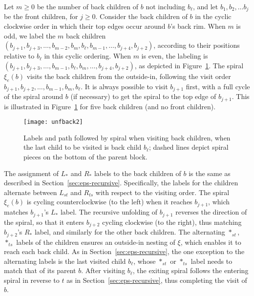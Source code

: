 \documentclass[11pt]{article}
\def\nothing{\ast}
\begin{document}
Let $m \geq 0$ be the number of back children of $b$ not including $b_\ell$,
and let $b_1, b_2, \dots b_j$ be the front children, for $j \geq 0$.
Consider the back children of $b$ in the cyclic clockwise order in which their top edges
occur around $b$'s back rim.
When $m$ is odd, we label the $m$ back children
$(b_{j+1}, b_{j+3}, \dots, b_{m-2},  b_m, b_\ell, b_{m-1}, \dots,  b_{j+4}, b_{j+2})$,
according to their positions relative to $b_\ell$ in this cyclic ordering.
When $m$ is even, the labeling is $(b_{j+1}, b_{j+3}, \dots, b_{m-1}, b_\ell, b_{m}, \dots,  b_{j+4}, b_{j+2})$,
as depicted in Figure~\ref{fig:unfback}. The spiral
$\xi_e(b)$ visits the back children from the outside-in, following the visit order
$b_{j+1}, b_{j+2}, \dots, b_{m-1}, b_{m}, b_\ell$.
It is always possible to visit $b_{j+1}$ first,
with a full cycle of the spiral around $b$ (if necessary) to get the spiral
to the top edge of $b_{j+1}$. This is illustrated in Figure~\ref{fig:unfback}
for five back children (and no front children).



\begin{figure}[htbp]
\centering
\texttt{[image: unfback2]}
\caption{Labels and path followed by spiral when visiting back children, when the last child
to be visited is back child $b_\ell$;
dashed
lines depict spiral pieces on the bottom of the parent block.}
\label{fig:unfback}
\end{figure}


The assignment of $L_{\nothing}$ and $R_{\nothing}$ labels to the back children of $b$ is the same as described
in Section~\ref{sec:eps-recursive}.
Specifically, the labels for the children alternate between $L_{st}$
and $R_{ts}$ with respect to the visiting order.  The spiral $\xi_e(b)$ is cycling
counterclockwise (to the left) when it reaches $b_{j+1}$, which
matches $b_{j+1}$'s $L_{\nothing}$ label.
The recursive unfolding of $b_{j+1}$ reverses the direction of the spiral, so
that it enters
$b_{j+2}$
cycling clockwise (to the right), thus matching
$b_{j+2}$'s $R_{\nothing}$ label,
and similarly for the other back children.  The
alternating $\nothing_{st}$, $\nothing_{ts}$ labels of the children ensures an outside-in
nesting of $\xi$, which enables it to reach each back
child.  As in Section~\ref{sec:eps-recursive}, the one exception to the
alternating labels is the last visited child $b_\ell$, whose $\nothing_{st}$ or $\nothing_{ts}$ label
needs to match that of its parent $b$.
After visiting $b_\ell$, the exiting spiral follows the entering spiral in reverse to $t$
as in Section~\ref{sec:eps-recursive}, thus completing the visit of $b$.
\end{document}
